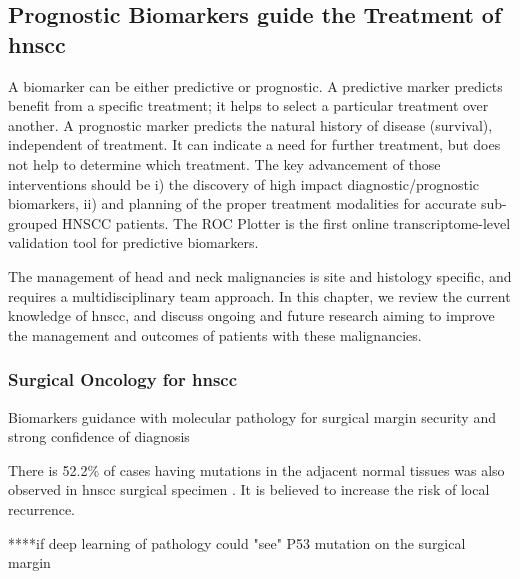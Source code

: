 \documentclass[12pt, a4paper]{article}
\begin{document}
\subsection{Prognostic Biomarkers guide the Treatment of \acrshort{hnscc}}
A biomarker can be either predictive or prognostic. A predictive marker predicts benefit from a specific treatment; it helps to select a particular treatment over another. A prognostic marker predicts the natural history of disease (survival), independent of treatment. It can indicate a need for further treatment, but does not help to determine which treatment. 
 The key advancement of those interventions should be i) the discovery of high impact diagnostic/prognostic biomarkers, ii) and planning of the proper treatment modalities for accurate sub-grouped HNSCC patients.
The ROC Plotter is the first online transcriptome-level validation tool for predictive biomarkers.

The management of head and neck malignancies is site and histology specific, and requires a multidisciplinary team approach. In this chapter, we review the current knowledge of \acrshort{hnscc}, and discuss ongoing and future research aiming to improve the management and outcomes of patients with these malignancies.





\subsubsection{Surgical Oncology for \acrshort{hnscc}}
Biomarkers guidance with molecular pathology for surgical margin security and strong confidence of diagnosis

There is 52.2\% of cases having mutations in the adjacent normal tissues was also observed in \acrshort{hnscc} surgical specimen \citep{Singh2016}. It is believed to increase the risk of local recurrence.

****if deep learning of pathology could "see" P53 mutation on the surgical margin

\end{document}
